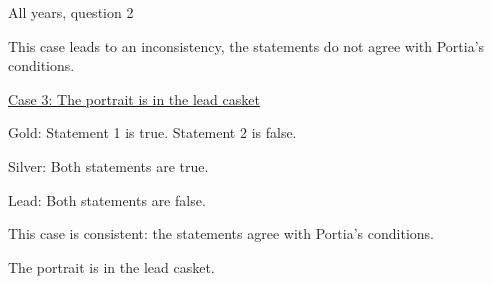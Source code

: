 \begin{MyInnerBox}{All years, question 2}
{\begin{MySolutionBox}
        This case leads to an inconsistency, the statements do not agree with Portia's conditions.\par\medskip
        \underline{Case 3: The portrait is in the lead casket}\par
        \hspace{1em}Gold:\; Statement 1 is true. Statement 2 is false.\par
        \hspace{1em}Silver: Both statements are true.\par
        \hspace{1em}Lead:\: Both statements are false.\par
        This case is consistent: the statements agree with Portia's conditions.\par\medskip
        The portrait is in the lead casket.\par
      \end{MySolutionBox}
    }{}%
    \end{MyInnerBox}

